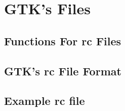 \chapter{GTK's Files}
	\section{Functions For rc Files}
	\section{GTK's rc File Format}
	\section{Example rc file}
